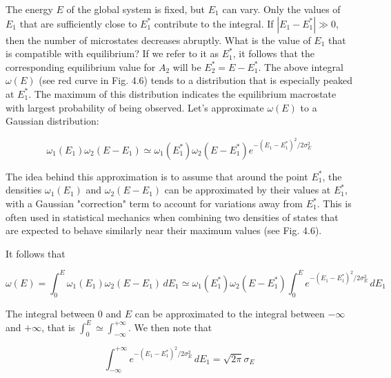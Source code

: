 \documentclass[12pt,a4paper]{report}
\newcommand{\esp}{\vspace{0.5cm}}
\begin{document}
	\esp
	
	The energy $E$ of the global system is fixed, but $E_1$ can vary. Only the values of $E_1$ that are sufficiently close to $E_1^*$ contribute to the integral. If $|E_1 - E_1^*| \gg 0$, then the number of microstates decreases abruptly. What is the value of $E_1$ that is compatible with equilibrium? If we refer to it as $E_1^*$, it follows that the corresponding equilibrium value for $A_2$ will be $E_2^* = E - E_1^*$. The above integral $\omega(E)$ (see red curve in Fig. 4.6) tends to a distribution that is especially peaked at $E_1^*$. The maximum of this distribution indicates the equilibrium macrostate with largest probability of being observed. Let’s approximate $\omega(E)$ to a Gaussian distribution:
	
	\esp
	
	\begin{equation}
		\omega_1(E_1) \omega_2(E - E_1) \simeq \omega_1(E_1^*) \omega_2(E - E_1^*) e^{-(E_1 - E_1^*)^2/2\sigma_E^2}
	\end{equation}
	
	\esp
	
	The idea behind this approximation is to assume that around the point $E_1^*$, the densities $\omega_1(E_1)$ and $\omega_2(E - E_1)$ can be approximated by their values at $E_1^*$, with a Gaussian "correction" term to account for variations away from $E_1^*$. This is often used in statistical mechanics when combining two densities of states that are expected to behave similarly near their maximum values (see Fig. 4.6).
	
	\esp
	
	\noindent It follows that
	
	\esp
	
	\begin{equation}
		\omega(E) = \int_0^E \omega_1(E_1) \omega_2(E - E_1) \, dE_1 \simeq \omega_1(E_1^*) \omega_2(E - E_1^*) \int_0^E e^{-(E_1 - E_1^*)^2/2\sigma_E^2} \, dE_1
	\end{equation}
	
	\esp
	
	The integral between 0 and $E$ can be approximated to the integral between $-\infty$ and $+\infty$, that is $\int_0^E \simeq \int_{-\infty}^{+\infty}$. We then note that
	
	\esp
	
	\begin{equation}
		\int_{-\infty}^{+\infty} e^{-(E_1 - E_1^*)^2/2\sigma_E^2} \, dE_1 = \sqrt{2\pi} \sigma_E
	\end{equation}
	
\end{document}
